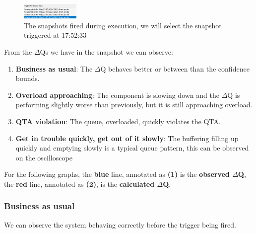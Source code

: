         \begin{figure}
            \caption{The snapshots fired during execution, we will select the snapshot triggered at 17:52:33}\label{wrap-fig:1}
            \includegraphics[width=0.25\textwidth]{img/snapshots.png}
        \end{figure} 


        From the $\Delta$Qs we have in the snapshot we can observe:
        \begin{enumerate}
            \item \textbf{Business as usual}: The $\Delta$Q behaves better or between than the confidence bounds.
            \item \textbf{Overload approaching}: The component is slowing down and the $\Delta$Q is performing slightly worse than previously, but it is still approaching overload.
            \item \textbf{QTA violation}: The queue, overloaded, quickly violates the QTA.
            \item \textbf{Get in trouble quickly, get out of it slowly}: The buffering filling up quickly and emptying slowly is a typical queue pattern, this can be observed on the oscilloscope
        \end{enumerate}
        
        For the following graphs, the \textbf{blue} line, annotated as \textbf{(1)} is the \textbf{observed $\Delta$Q}, the \textbf{red} line, annotated as \textbf{(2)}, is the \textbf{calculated $\Delta$Q}. 
        \subsubsection{Business as usual}
            We can observe the system behaving correctly before the trigger being fired.
             
